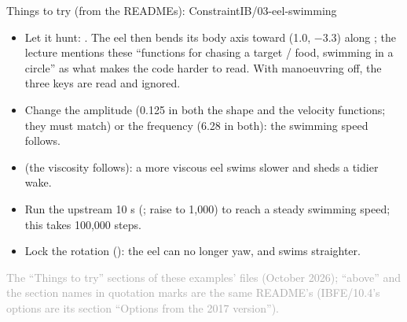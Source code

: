 \documentclass[aspectratio=169,11pt]{beamer}
\newcommand{\sourcecredit}[1]{\vfill\begin{flushright}\tiny\textcolor{DarkGray}{#1}\end{flushright}}
\begin{document}
\begin{frame}{Things to try (from the READMEs): ConstraintIB/03-eel-swimming}
\scriptsize\setlength{\leftmargini}{5em}
\begin{itemize}\setlength{\itemsep}{1pt}
  \item[CIB/03.1] Let it hunt: . The eel then bends its body axis toward  (1.0, $-$3.3) along ; the lecture mentions these ``functions for chasing a target / food, swimming in a circle'' as what makes the code harder to read. With manoeuvring off, the three keys are read and ignored.
  \item[CIB/03.2] Change the amplitude (0.125 in both the shape and the velocity functions; they must match) or the frequency (6.28 in both): the swimming speed follows.
  \item[CIB/03.3]  (the viscosity follows): a more viscous eel swims slower and sheds a tidier wake.
  \item[CIB/03.4] Run the upstream 10 s (; raise  to 1,000) to reach a steady swimming speed; this takes 100,000 steps.
  \item[CIB/03.5] Lock the rotation (): the eel can no longer yaw, and swims straighter.
\end{itemize}
\sourcecredit{The ``Things to try'' sections of these examples' \code{README.md} files (October 2026); ``above'' and the section names in quotation marks are the same README's (IBFE/10.4's options are its section ``Options from the 2017 version'').}
\end{frame}
\end{document}
